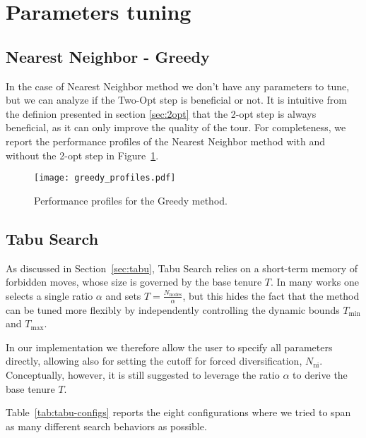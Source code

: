 \section{Parameters tuning}

\subsection{Nearest Neighbor - Greedy}
\label{ssec:nn-tuning}

In the case of Nearest Neighbor method we don't have any parameters to tune, but we can analyze if the Two-Opt step is beneficial or not. It is intuitive from the definion presented in section \ref{sec:2opt} that the 2-opt step is always beneficial, as it can only improve the quality of the tour. For completeness, we report the performance profiles of the Nearest Neighbor method with and without the 2-opt step in Figure~\ref{fig:nn-profiles}.

\begin{figure}[H]
  \centering
  \texttt{[image: greedy\_profiles.pdf]}
  \caption{Performance profiles for the Greedy method.}
  \label{fig:nn-profiles}
\end{figure}

\subsection{Tabu Search}
\label{ssec:tabu-tuning}
As discussed in Section~\ref{sec:tabu}, Tabu Search relies on a short-term memory of forbidden moves, whose size is governed by the base tenure \(T\).  In many works one selects a single ratio \(\alpha\) and sets \(T=\frac{N_{\mathrm{nodes}}}{\alpha}\), but this hides the fact that the method can be tuned more flexibly by independently controlling the dynamic bounds \(T_{\min}\) and \(T_{\max}\).

In our implementation we therefore allow the user to specify all parameters directly, allowing also for setting the cutoff for forced diversification, \(N_{\mathrm{ni}}\). Conceptually, however, it is still suggested to leverage the ratio \(\alpha\) to derive the base tenure \(T\).

Table~\ref{tab:tabu-configs} reports the eight configurations where we tried to span as many different search behaviors as possible.

